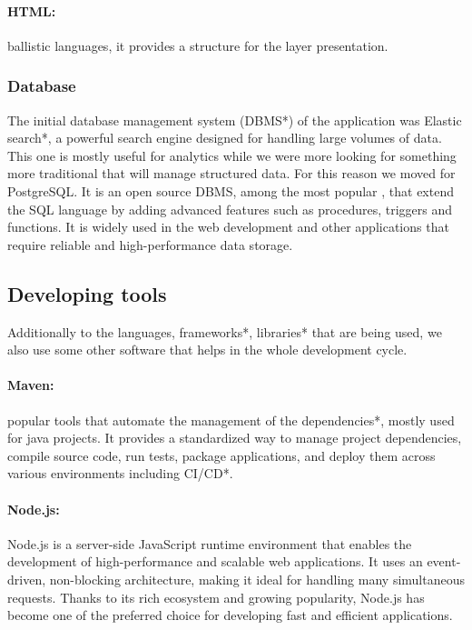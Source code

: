 \documentclass[12pt,a4paper,table,english]{article}
\begin{document}
	\paragraph{HTML:} ballistic languages, it provides a structure for the layer presentation. 

	\subsubsection{Database}
	
	The initial database management system (DBMS*) of the application was Elastic search*, a powerful search engine designed for handling large volumes of data. This one is mostly useful for analytics while we were more looking for something more traditional that will manage structured data. For this reason we moved for PostgreSQL. It is an open source DBMS, among the most popular \citep{stat1, stat2}, that extend the SQL language by adding advanced features such as procedures, triggers and functions. It is widely used in the web development and other applications that require reliable and high-performance data storage.
	
	
	\subsection{Developing tools}
	
	Additionally to the languages, frameworks*, libraries* that are being used, we also use some other software that helps in the whole development cycle.
	
	\paragraph{Maven:} popular tools that automate the management of the dependencies*, mostly used for java projects. It provides a standardized way to manage project dependencies, compile source code, run tests, package applications, and deploy them across various environments including CI/CD*. 
	
	\paragraph{Node.js:} Node.js is a server-side JavaScript runtime environment that enables the development of high-performance and scalable web applications. It uses an event-driven, non-blocking architecture, making it ideal for handling many simultaneous requests. Thanks to its rich ecosystem and growing popularity, Node.js has become one of the preferred choice for developing fast and efficient applications.
	
\end{document}
